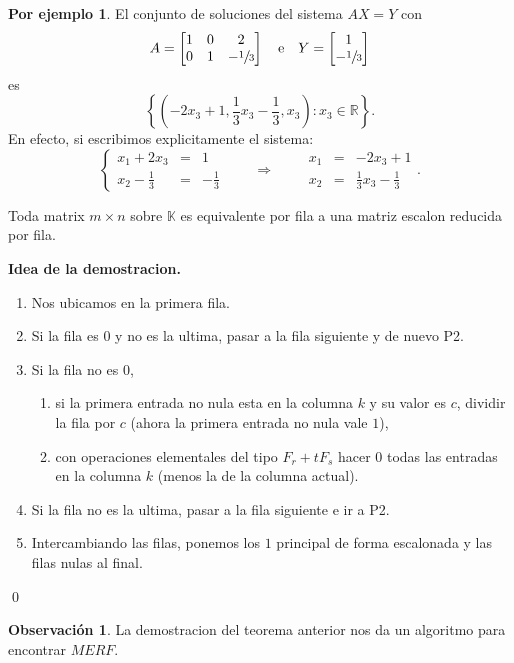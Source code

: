 \documentclass{article}
\theoremstyle{definition}
\theoremstyle{definition}
\newtheorem*{obs}{Observación}
\newtheorem*{ej}{Por ejemplo}
\theoremstyle{remark}
\begin{document}
\begin{ej}
  El conjunto de soluciones del sistema $AX=Y$ con \[
    A=\begin{bmatrix} 1 & 0 & 2 \\ 0 & 1 & -\sfrac{1}{3} \end{bmatrix} \quad \text{e} \quad Y=\begin{bmatrix} 1 \\ -\sfrac{1}{3}\end{bmatrix}
  \]
  es 
  \[ 
    \left\{\left(-2x_3+1, \frac{1}{3}x_3-\frac{1}{3},x_3\right) : x_3 \in \mathbb{R}\right\}.
  \]
  En efecto, si escribimos explicitamente el sistema: \[
    \left\{\begin{array}{llr} x_1 + 2x_3 & = & 1 \\ x_2 - \frac{1}{3} & = & -\frac{1}{3}\end{array}\right. \quad \quad \Longrightarrow \quad \quad \begin{array}{lll} x_1 & = & -2x_3 + 1 \\x_2 & = & \frac{1}{3} x_3 - \frac{1}{3} \end{array}.
  \]
\end{ej}
\begin{teo}
  Toda matrix $m \times n$ sobre $\mathbb{K}$ es equivalente por fila a una matriz escalon reducida por fila.
\end{teo}
\textbf{Idea de la demostracion.} 
\begin{enumerate}[label=\textcolor{azulp2}{P\arabic*.}]
  \item Nos ubicamos en la primera fila.
  \item Si la fila es $0$ y no es la ultima, pasar a la fila siguiente y de nuevo \textcolor{azulp2}{P2}.
  \item Si la fila no es $0$, 
    \begin{enumerate}[label=\textcolor{azulp2}{P3.\arabic*}]
  \item si la primera entrada no nula esta en la columna $k$ y su valor es $c$, dividir la fila por $c$ (ahora la primera entrada no nula vale $1$),
  \item con operaciones elementales del tipo $F_r+tF_s$ hacer $0$ todas las entradas en la columna $k$ (menos la de la columna actual).
\end{enumerate}
\item Si la fila no es la ultima, pasar a la fila siguiente e ir a \textcolor{azulp2}{P2}.
\item Intercambiando las filas, ponemos los $1$ principal de forma escalonada y las filas nulas al final.
\end{enumerate}
\qed
\begin{obs}
  La demostracion del teorema anterior nos da un algoritmo para encontrar $MERF$.
\end{obs}
\pagebreak
\end{document}
